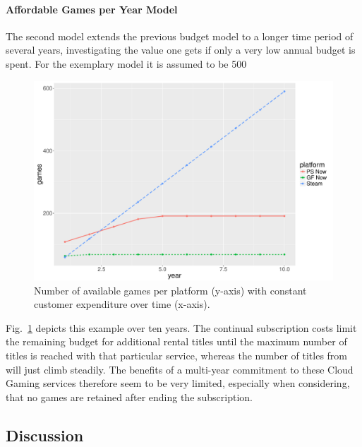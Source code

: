 \paragraph{Affordable Games per Year Model}

The second model extends the previous budget model to a longer time period of several years, investigating the value one gets if only a very low annual budget is spent. For the exemplary model it is assumed to be \SI{500}{\EUR}

\begin{figure}[!t]
	\centering
	\includegraphics[width=1.0\columnwidth]{images/games-over-year.pdf}
	\caption{Number of available games per platform (y-axis) with constant customer expenditure over time (x-axis).}
\label{fig:games-over-years}
\end{figure}

Fig.~\ref{fig:games-over-years} depicts this example over ten years. The continual subscription costs limit the remaining budget for additional rental titles until the maximum number of titles is reached with that particular service, whereas the number of titles from \steam will just climb steadily. The benefits of a multi-year commitment to these Cloud Gaming services therefore seem to be very limited, especially when considering, that no games are retained after ending the subscription.


\subsection{Discussion}

